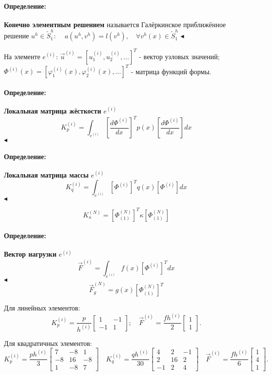 \documentclass{article}
\newenvironment{definition}{ \paragraph{Определение:}}{\hfill $\blacktriangleleft$}
\begin{document}
\begin{definition}
	\textbf{Конечно элементным решением} называется Галёркинское приближённое решение $u^h \in \tilde{S}_1^h $: $\quad a(u^h, v^h) = l(v^h), \quad \forall v^h(x) \in \tilde{S}_1^h $
\end{definition}

\bigskip

На элементе $e^{(i)}$:
$\overrightarrow{u}^{(i)} = [ u_1^{(i)}, u_2^{(i)}, ...]^T$ - вектор узловых значений;
$\Phi^{(i)}(x) = [\varphi_1^{(i)}(x), \varphi_2^{(i)}(x), ...]^T$ - матрица функций формы.

\begin{definition}
	\textbf{Локальная матрица жёсткости} $e^{(i)}$
	\[
		K_p^{(i)} = \int_{e^{(i)}} \left[ \dfrac{d \Phi^{(i)}}{dx} \right]^T p(x) \left[ \dfrac{d \Phi^{(i)}}{dx} \right] dx
	\]
\end{definition}

\begin{definition}
	\textbf{Локальная матрица массы} $e^{(i)}$
	\[
		K_q^{(i)} = \int_{e^{(i)}} \left[ \Phi^{(i)} \right]^T q(x) \left[ \Phi^{(i)} \right] dx
	\]
\end{definition}

\[
	K_{\kappa}^{(N)} = \left[ \Phi_{(1)}^{(N)} \right]^T \kappa \left[ \Phi_{(1)}^{(N)} \right]
\]

\begin{definition}
	\textbf{Вектор нагрузки} $e^{(i)}$
	\[
		\overrightarrow{F}^{(i)} = \int_{e^{(i)}} f(x) \left[ \Phi^{(i)} \right]^T dx
	\]
\end{definition}
\[
	\overrightarrow{F}_{g}^{(N)} = g(x) \left[ \Phi_{(1)}^{(N)} \right]^T
\]

Для линейных элементов:
\[
K_p^{(i)} = \dfrac{p}{h^{(i)}}
\begin{bmatrix}
1 & -1\\
-1&  1
\end{bmatrix};
\quad
\overrightarrow{F}^{(i)}  = \dfrac{f h^{(i)} }{2} 
\begin{bmatrix}
1\\
1
\end{bmatrix}.
\]

Для квадратичных элементов:
\[
K_p^{(i)} = \dfrac{p h^{(i)}}{3}
\begin{bmatrix}
7 & -8 & 1\\
-8 & 16 & -8\\
1 & -8 & 7
\end{bmatrix}
\quad
K_q^{(i)} = \dfrac{q h^{(i)}}{30}
\begin{bmatrix}
4 & 2 & -1\\
2 & 16 & 2\\
-1 & 2 & 4
\end{bmatrix}
\quad
\overrightarrow{F}^{(i)}  = \dfrac{f h^{(i)} }{6} 
\begin{bmatrix}
1\\
4\\
1
\end{bmatrix}.
\]
\end{document}
